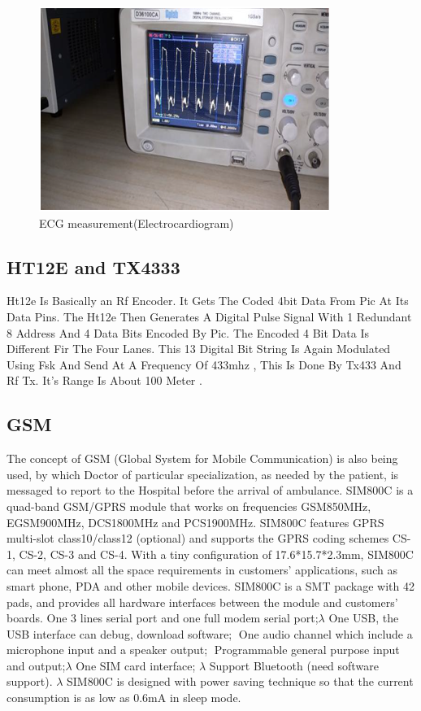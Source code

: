 \documentclass[12pt,a4paper,oneside,openright]{report}
\begin{document}
\begin{figure}[!h]
 \centering
 \includegraphics[width = .80\textwidth]{Figures/11.jpg}
 \caption{ECG measurement(Electrocardiogram)}
 \label{mecg}
\end{figure}

\subsection{HT12E and TX4333}
Ht12e Is Basically an Rf Encoder. It Gets The Coded 4bit Data From Pic At Its Data  Pins. The Ht12e Then Generates A Digital Pulse Signal With 1 Redundant 8 Address And 4 Data Bits Encoded By Pic. The Encoded 4 Bit Data Is Different Fir The Four Lanes. This 13 Digital Bit String Is Again Modulated Using Fsk And Send At A Frequency Of 433mhz , This Is Done By Tx433 And Rf Tx. It’s Range Is About 100 Meter .
\subsection{GSM}
The concept of GSM (Global System for Mobile Communication) is also being used, by which Doctor of particular specialization, as needed by the patient, is messaged to report to the Hospital before the arrival of ambulance. SIM800C is a quad-band GSM/GPRS module that works on frequencies GSM850MHz, EGSM900MHz, DCS1800MHz and PCS1900MHz. SIM800C features GPRS multi-slot class10/class12 (optional) and supports the GPRS coding schemes CS-1, CS-2, CS-3 and CS-4. With a tiny configuration of 17.6*15.7*2.3mm, SIM800C can meet almost all the space requirements in customers’ applications, such as smart phone, PDA and other mobile devices. SIM800C is a SMT package with 42 pads, and provides all hardware interfaces between the module and customers’ boards.  One 3 lines serial port and one full modem serial port;$\lambda$  One USB, the USB interface can debug, download software;  One audio channel which include a microphone input and a speaker output;  Programmable general purpose input and output;$\lambda$  One SIM card interface; $\lambda$  Support Bluetooth (need software support). $\lambda$ SIM800C is designed with power saving technique so that the current consumption is as low as 0.6mA in sleep mode.
\end{document}
